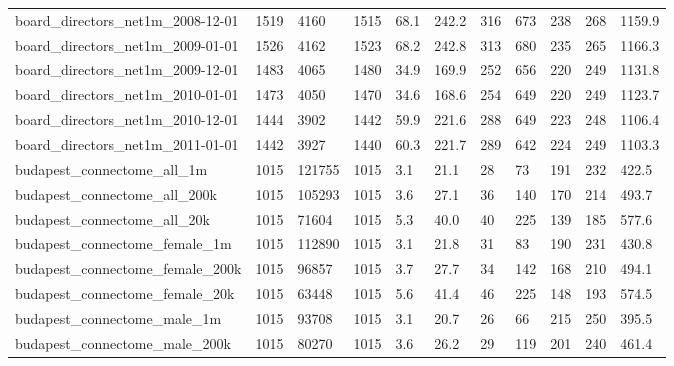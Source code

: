 \begin{longtable}{lllllllllll}
 board\_directors\_net1m\_2008-12-01                   & 1519       & 4160      & 1515  & 68.1   & 242.2  & 316   & 673    & 238    & 268    & 1159.9  \\
 board\_directors\_net1m\_2009-01-01                   & 1526       & 4162      & 1523  & 68.2   & 242.8  & 313   & 680    & 235    & 265    & 1166.3  \\
 board\_directors\_net1m\_2009-12-01                   & 1483       & 4065      & 1480  & 34.9   & 169.9  & 252   & 656    & 220    & 249    & 1131.8  \\
 board\_directors\_net1m\_2010-01-01                   & 1473       & 4050      & 1470  & 34.6   & 168.6  & 254   & 649    & 220    & 249    & 1123.7  \\
 board\_directors\_net1m\_2010-12-01                   & 1444       & 3902      & 1442  & 59.9   & 221.6  & 288   & 649    & 223    & 248    & 1106.4  \\
 board\_directors\_net1m\_2011-01-01                   & 1442       & 3927      & 1440  & 60.3   & 221.7  & 289   & 642    & 224    & 249    & 1103.3  \\
 budapest\_connectome\_all\_1m                         & 1015       & 121755    & 1015  & 3.1    & 21.1   & 28    & 73     & 191    & 232    & 422.5   \\
 budapest\_connectome\_all\_200k                       & 1015       & 105293    & 1015  & 3.6    & 27.1   & 36    & 140    & 170    & 214    & 493.7   \\
 budapest\_connectome\_all\_20k                        & 1015       & 71604     & 1015  & 5.3    & 40.0   & 40    & 225    & 139    & 185    & 577.6   \\
 budapest\_connectome\_female\_1m                      & 1015       & 112890    & 1015  & 3.1    & 21.8   & 31    & 83     & 190    & 231    & 430.8   \\
 budapest\_connectome\_female\_200k                    & 1015       & 96857     & 1015  & 3.7    & 27.7   & 34    & 142    & 168    & 210    & 494.1   \\
 budapest\_connectome\_female\_20k                     & 1015       & 63448     & 1015  & 5.6    & 41.4   & 46    & 225    & 148    & 193    & 574.5   \\
 budapest\_connectome\_male\_1m                        & 1015       & 93708     & 1015  & 3.1    & 20.7   & 26    & 66     & 215    & 250    & 395.5   \\
 budapest\_connectome\_male\_200k                      & 1015       & 80270     & 1015  & 3.6    & 26.2   & 29    & 119    & 201    & 240    & 461.4   \\

\end{longtable}
